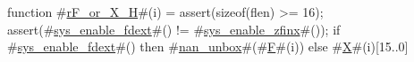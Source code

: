 function #\hyperref[sailRISCVzrFzyorzyXzyH]{rF\_or\_X\_H}#(i) = {
  assert(sizeof(flen) >= 16);
  assert(#\hyperref[sailRISCVzsyszyenablezyfdext]{sys\_enable\_fdext}#() != #\hyperref[sailRISCVzsyszyenablezyzzfinx]{sys\_enable\_zfinx}#());
  if   #\hyperref[sailRISCVzsyszyenablezyfdext]{sys\_enable\_fdext}#()
  then #\hyperref[sailRISCVznanzyunbox]{nan\_unbox}#(#\hyperref[sailRISCVzF]{F}#(i))
  else #\hyperref[sailRISCVzX]{X}#(i)[15..0]
}
